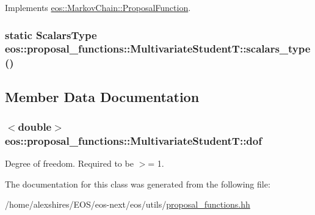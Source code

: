Implements \hyperlink{structeos_1_1MarkovChain_1_1ProposalFunction_a2b296008d32b1cd008e59cde1228705f}{eos::MarkovChain::ProposalFunction}.\hypertarget{classeos_1_1proposal__functions_1_1MultivariateStudentT_a32ceb99e081791885f277e033c809c83}{
\subsubsection[{scalars\_\-type}]{\setlength{\rightskip}{0pt plus 5cm}static {\bf ScalarsType} eos::proposal\_\-functions::MultivariateStudentT::scalars\_\-type ()}}
\label{classeos_1_1proposal__functions_1_1MultivariateStudentT_a32ceb99e081791885f277e033c809c83}


\subsection{Member Data Documentation}
\hypertarget{classeos_1_1proposal__functions_1_1MultivariateStudentT_addd13294ed7e93125f090a8c9250ea99}{
\subsubsection[{dof}]{$<$double$>$ {\bf eos::proposal\_\-functions::MultivariateStudentT::dof}}}
\label{classeos_1_1proposal__functions_1_1MultivariateStudentT_addd13294ed7e93125f090a8c9250ea99}
Degree of freedom. Required to be $>$= 1. 

The documentation for this class was generated from the following file:\begin{DoxyCompactItemize}
\item 
/home/alexshires/EOS/eos-\/next/eos/utils/\hyperlink{proposal__functions_8hh}{proposal\_\-functions.hh}\end{DoxyCompactItemize}
